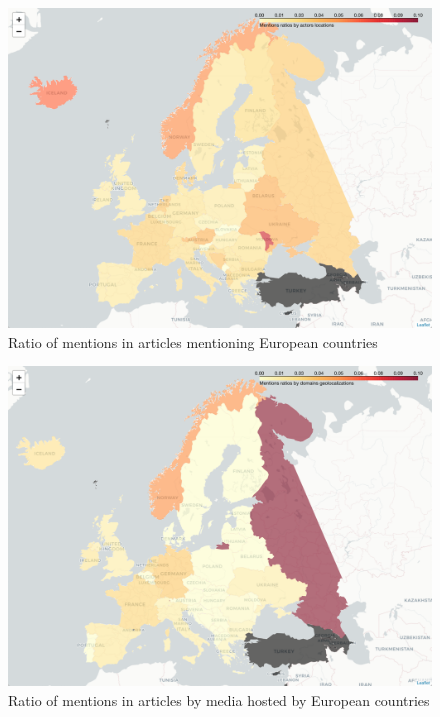 \documentclass[a4paper]{article}
\begin{document}
\begin{figure}[h]
   \centering
   \includegraphics[scale=0.5]{map_europe_actors.png}
    \caption{\label{corre_wide} Ratio of mentions in articles mentioning European countries}
\end{figure}

\begin{figure}[h]
   \centering
   \includegraphics[scale=0.5]{map_europe_domains.png}
    \caption{\label{corre_wide} Ratio of mentions in articles by media hosted by European countries}
\end{figure}
\end{document}
